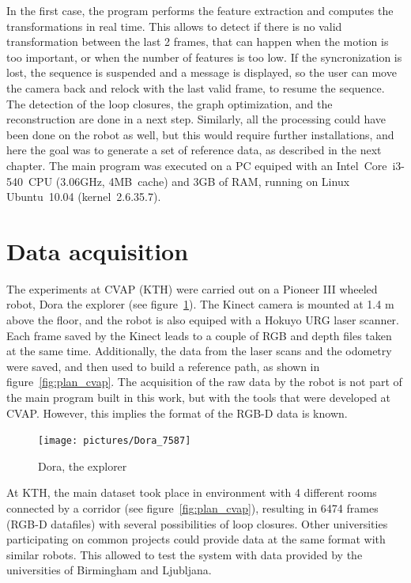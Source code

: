 In the first case, the program performs the feature extraction and computes the transformations in real time. This allows to detect if there is no valid transformation between the last 2 frames, that can happen when the motion is too important, or when the number of features is too low. If the syncronization is lost, the sequence is suspended and a message is displayed, so the user can move the camera back and relock with the last valid frame, to resume the sequence. The detection of the loop closures, the graph optimization, and the reconstruction are done in a next step. Similarly, all the processing could have been done on the robot as well, but this would require further installations, and here the goal was to generate a set of reference data, as described in the next chapter. The main program was executed on a PC equiped with an Intel~Core\texttrademark{}~i3-540~CPU (3.06GHz, 4MB~cache) and 3GB of RAM, running on Linux Ubuntu~10.04 (kernel~2.6.35.7).

\clearpage
\section{Data acquisition}

The experiments at \gls{CVAP} (KTH) were carried out on a Pioneer III wheeled robot, Dora the explorer (see figure~\ref{fig:dora}). The Kinect camera is mounted at 1.4 m above the floor, and the robot is also equiped with a Hokuyo URG laser scanner. Each frame saved by the Kinect leads to a couple of RGB and depth files taken at the same time. Additionally, the data from the laser scans and the odometry were saved, and then used to build a reference path, as shown in figure~\ref{fig:plan_cvap}. The acquisition of the raw data by the robot is not part of the main program built in this work, but with the tools that were developed at \gls{CVAP}. However, this implies the format of the RGB-D data is known.

\begin{figure}[h]
 \begin{center}
 \texttt{[image: pictures/Dora\_7587]}
 \end{center}
\caption{Dora, the explorer}
\label{fig:dora}
\end{figure}

At KTH, the main dataset took place in environment with 4 different rooms connected by a corridor (see figure~\ref{fig:plan_cvap}), resulting in 6474 frames (RGB-D datafiles) with several possibilities of loop closures. Other universities participating on common projects could provide data at the same format with similar robots. This allowed to test the system with data provided by the universities of Birmingham and Ljubljana.

